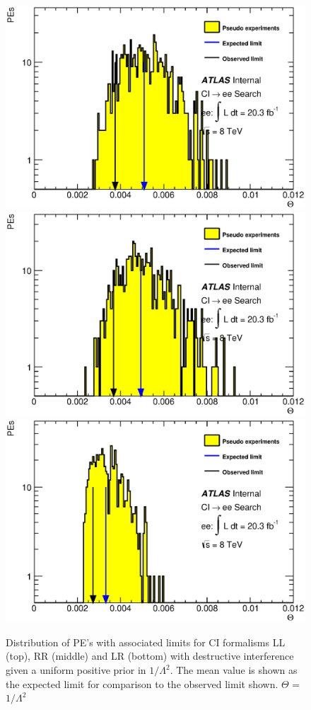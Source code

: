     \begin{figure}[h]
        \begin{center}
            \includegraphics[width=0.7\linewidth]{images/ee__LL_plus_L2/Theta.eps}
            \includegraphics[width=0.7\linewidth]{images/ee__RR_plus_L2/Theta.eps}
            \includegraphics[width=0.7\linewidth]{images/ee__LR_plus_L2/Theta.eps}
        \end{center}
       \caption{Distribution of PE's with associated limits for CI formalisms LL (top), RR (middle) and LR (bottom) with destructive interference given a uniform positive prior in $1/\Lambda^{2}$. The mean value is shown as the expected limit for comparison to the observed limit shown. $\Theta$ = $1/\Lambda^{2}$}
       \label{fig:Theta_CI_des}
    \end{figure}



